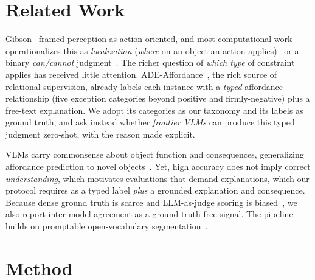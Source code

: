 \documentclass[runningheads]{llncs}
\begin{document}
\section{Related Work}
\label{sec:related}

Gibson~\cite{gibson2014ecological} framed perception as action-oriented, and most computational work operationalizes this as \emph{localization} (\emph{where} on an object an action applies)~\cite{affordancellm} or a binary \emph{can/cannot} judgment~\cite{do2018affordancenet}.
The richer question of \emph{which type} of constraint applies has received little attention.
ADE-Affordance~\cite{ade_affordance}, the rich source of relational supervision, already labels each instance with a \emph{typed} affordance relationship (five exception categories beyond positive and firmly-negative) plus a free-text explanation.
We adopt its categories as our taxonomy and its labels as ground truth, and ask instead whether \emph{frontier VLMs} can produce this typed judgment zero-shot, with the reason made explicit.

VLMs carry commonsense about object function and consequences, generalizing affordance prediction to novel objects~\cite{affordancellm}.
Yet, high accuracy does not imply correct \emph{understanding}, which motivates evaluations that demand explanations, which our protocol requires as a typed label \emph{plus} a grounded explanation and consequence.
Because dense ground truth is scarce and LLM-as-judge scoring is biased~\cite{zheng2023judging}, we also report inter-model agreement as a ground-truth-free signal. 
The pipeline builds on promptable open-vocabulary segmentation~\cite{ravi2025sam2,sam3}.


\section{Method}
\label{sec:method}
\end{document}
